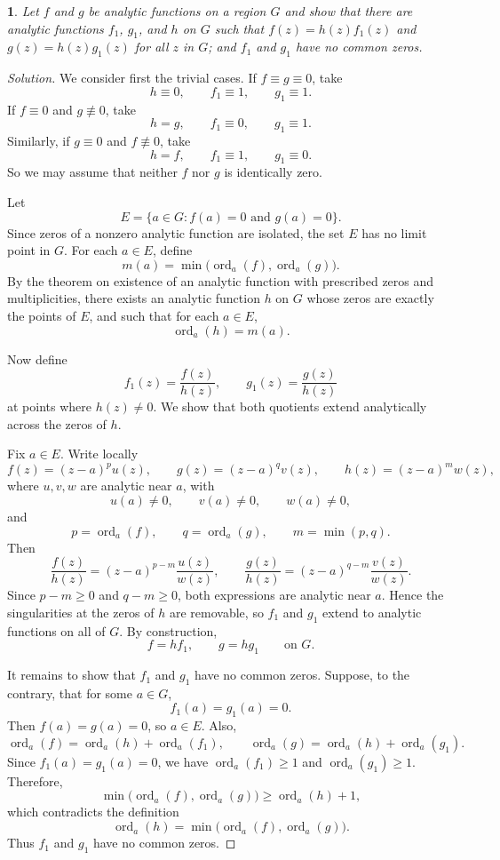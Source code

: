 \documentclass[12pt, a4paper]{report}
\theoremstyle{spaced}
\newtheorem{exercise}{}
\newcommand{\setexercise}[1]{\setcounter{exercise}{#1-1}}
\begin{document}
\setexercise{3}
\begin{exercise}
	Let $f$ and $g$ be analytic functions on a region $G$ and show that there are analytic functions $f_1$, $g_1$, and $h$ on $G$ such that $f(z)=h(z)f_1(z)$ and $g(z)=h(z)g_1(z)$ for all $z$ in $G$; and $f_1$ and $g_1$ have no common zeros.
\end{exercise}
\begin{proof}[Solution]
	We consider first the trivial cases. If \(f\equiv g\equiv 0\), take
	\[
		h\equiv 0,\qquad f_1\equiv 1,\qquad g_1\equiv 1.
	\]
	If \(f\equiv 0\) and \(g\not\equiv 0\), take
	\[
		h=g,\qquad f_1\equiv 0,\qquad g_1\equiv 1.
	\]
	Similarly, if \(g\equiv 0\) and \(f\not\equiv 0\), take
	\[
		h=f,\qquad f_1\equiv 1,\qquad g_1\equiv 0.
	\]
	So we may assume that neither \(f\) nor \(g\) is identically zero.

	Let
	\[
		E=\{a\in G: f(a)=0 \text{ and } g(a)=0\}.
	\]
	Since zeros of a nonzero analytic function are isolated, the set \(E\) has no limit point in \(G\). For each \(a\in E\), define
	\[
		m(a)=\min\bigl(\operatorname{ord}_a(f),\operatorname{ord}_a(g)\bigr).
	\]
	By the theorem on existence of an analytic function with prescribed zeros and multiplicities, there exists an analytic function \(h\) on \(G\) whose zeros are exactly the points of \(E\), and such that for each \(a\in E\),
	\[
		\operatorname{ord}_a(h)=m(a).
	\]

	Now define
	\[
		f_1(z)=\frac{f(z)}{h(z)},\qquad g_1(z)=\frac{g(z)}{h(z)}
	\]
	at points where \(h(z)\neq 0\). We show that both quotients extend analytically across the zeros of \(h\).

	Fix \(a\in E\). Write locally
	\[
		f(z)=(z-a)^p u(z),\qquad g(z)=(z-a)^q v(z),\qquad h(z)=(z-a)^m w(z),
	\]
	where \(u,v,w\) are analytic near \(a\), with
	\[
		u(a)\neq 0,\qquad v(a)\neq 0,\qquad w(a)\neq 0,
	\]
	and
	\[
		p=\operatorname{ord}_a(f),\qquad q=\operatorname{ord}_a(g),\qquad m=\min(p,q).
	\]
	Then
	\[
		\frac{f(z)}{h(z)}=(z-a)^{p-m}\frac{u(z)}{w(z)},\qquad
		\frac{g(z)}{h(z)}=(z-a)^{q-m}\frac{v(z)}{w(z)}.
	\]
	Since \(p-m\ge 0\) and \(q-m\ge 0\), both expressions are analytic near \(a\). Hence the singularities at the zeros of \(h\) are removable, so \(f_1\) and \(g_1\) extend to analytic functions on all of \(G\). By construction,
	\[
		f=hf_1,\qquad g=hg_1 \qquad \text{on } G.
	\]

	It remains to show that \(f_1\) and \(g_1\) have no common zeros. Suppose, to the contrary, that for some \(a\in G\),
	\[
		f_1(a)=g_1(a)=0.
	\]
	Then \(f(a)=g(a)=0\), so \(a\in E\). Also,
	\[
		\operatorname{ord}_a(f)=\operatorname{ord}_a(h)+\operatorname{ord}_a(f_1),\qquad
		\operatorname{ord}_a(g)=\operatorname{ord}_a(h)+\operatorname{ord}_a(g_1).
	\]
	Since \(f_1(a)=g_1(a)=0\), we have \(\operatorname{ord}_a(f_1)\ge 1\) and \(\operatorname{ord}_a(g_1)\ge 1\). Therefore,
	\[
		\min\bigl(\operatorname{ord}_a(f),\operatorname{ord}_a(g)\bigr)
		\ge \operatorname{ord}_a(h)+1,
	\]
	which contradicts the definition
	\[
		\operatorname{ord}_a(h)=\min\bigl(\operatorname{ord}_a(f),\operatorname{ord}_a(g)\bigr).
	\]
	Thus \(f_1\) and \(g_1\) have no common zeros.


\end{proof}
\end{document}
